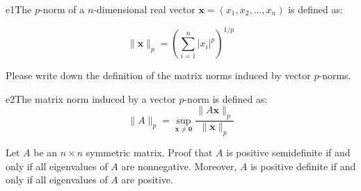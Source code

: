 \documentclass{article}
\begin{document}
\begin{SOLUTION}{e1}The $p$-norm of a $n$-dimensional real vector $\mathbf{x} = (x_1, x_2, \dots, x_n)$ is defined as:

\[
\|\mathbf{x}\|_p = \left( \sum_{i=1}^n |x_i|^p \right)^{1/p}
\]
	
\end{SOLUTION}


\begin{excercise}\label{e2}
Please write down the definition of the matrix norms induced by vector $p$-norms.
\end{excercise}

\begin{SOLUTION}{e2}The matrix norm induced by a vector $p$-norm is defined as:
	\[
	\|A\|_p = \sup_{\mathbf{x} \neq \mathbf{0}} \frac{\|A\mathbf{x}\|_p}{\|\mathbf{x}\|_p}
	\]
\end{SOLUTION}


\begin{excercise}\label{e3}
	Let $A$ be an $n \times n$ symmetric matrix. Proof that $A$ is positive semidefinite if and only if all eigenvalues of $A$ are nonnegative. Moreover, $A$ is positive definite if and only if all eigenvalues of $A$ are positive.
\end{excercise}
\end{document}
